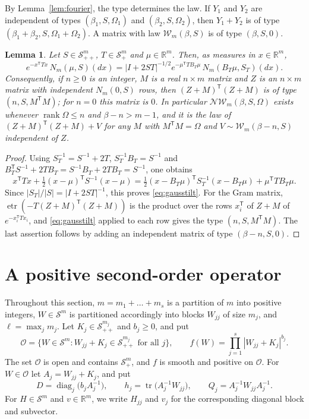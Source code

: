 \documentclass{amsart}
\newtheorem{lemma}[theorem]{Lemma}
\theoremstyle{definition}
\theoremstyle{remark}
\numberwithin{equation}{section}
\newcommand{\R}{\mathbb{R}}
\newcommand{\Sym}{\mathcal{S}}
\newcommand{\W}{\mathcal{W}}
\newcommand{\NW}{\mathcal{N}\!\mathcal{W}}
\newcommand{\tr}{\operatorname{tr}}
\newcommand{\etr}{\operatorname{etr}}
\newcommand{\rank}{\operatorname{rank}}
\newcommand{\diag}{\operatorname{diag}}
\begin{document}
By Lemma~\ref{lem:fourier}, the type determines the law. If $Y_1$ and $Y_2$ are independent of types $(\beta_1,S,\Omega_1)$ and $(\beta_2,S,\Omega_2)$, then $Y_1+Y_2$ is of type $(\beta_1+\beta_2,S,\Omega_1+\Omega_2)$. A matrix with law $\W_m(\beta,S)$ is of type $(\beta,S,0)$.

\begin{lemma}\label{lem:gauss}
Let $S\in\Sym^m_{++}$, $T\in\Sym^m_+$ and $\mu\in\R^m$. Then, as measures in $x\in\R^m$,
\begin{equation}\label{eq:gausstilt}
e^{-x^{\mathsf T}Tx}\,N_m(\mu,S)(dx)=|I+2ST|^{-1/2}e^{-\mu^{\mathsf T}TB_T\mu}\,N_m(B_T\mu,S_T)(dx).
\end{equation}
Consequently, if $n\ge0$ is an integer, $M$ is a real $n\times m$ matrix and $Z$ is an $n\times m$ matrix with independent $N_m(0,S)$ rows, then $(Z+M)^{\mathsf T}(Z+M)$ is of type $(n,S,M^{\mathsf T}M)$; for $n=0$ this matrix is $0$. In particular $\NW_m(\beta,S,\Omega)$ exists whenever $\rank\Omega\le n$ and $\beta-n>m-1$, and it is the law of $(Z+M)^{\mathsf T}(Z+M)+V$ for any $M$ with $M^{\mathsf T}M=\Omega$ and $V\sim\W_m(\beta-n,S)$ independent of $Z$.
\end{lemma}

\begin{proof}
Using $S_T^{-1}=S^{-1}+2T$, $S_T^{-1}B_T=S^{-1}$ and $B_T^{\mathsf T}S^{-1}+2TB_T=S^{-1}B_T+2TB_T=S^{-1}$, one obtains
\[
x^{\mathsf T}Tx+\tfrac12(x-\mu)^{\mathsf T}S^{-1}(x-\mu)=\tfrac12(x-B_T\mu)^{\mathsf T}S_T^{-1}(x-B_T\mu)+\mu^{\mathsf T}TB_T\mu .
\]
Since $|S_T|/|S|=|I+2ST|^{-1}$, this proves \eqref{eq:gausstilt}. For the Gram matrix, $\etr(-T(Z+M)^{\mathsf T}(Z+M))$ is the product over the rows $x_i^{\mathsf T}$ of $Z+M$ of $e^{-x_i^{\mathsf T}Tx_i}$, and \eqref{eq:gausstilt} applied to each row gives the type $(n,S,M^{\mathsf T}M)$. The last assertion follows by adding an independent matrix of type $(\beta-n,S,0)$.
\end{proof}

\section{A positive second-order operator}\label{sec:operator}

Throughout this section, $m=m_1+\dots+m_s$ is a partition of $m$ into positive integers, $W\in\Sym^m$ is partitioned accordingly into blocks $W_{jj}$ of size $m_j$, and $\ell=\max_jm_j$. Let $K_j\in\Sym^{m_j}_{++}$ and $b_j\ge0$, and put
\[
\mathcal O=\{W\in\Sym^m:W_{jj}+K_j\in\Sym^{m_j}_{++}\text{ for all }j\},\qquad
f(W)=\prod_{j=1}^s|W_{jj}+K_j|^{b_j}.
\]
The set $\mathcal O$ is open and contains $\Sym^m_+$, and $f$ is smooth and positive on $\mathcal O$. For $W\in\mathcal O$ let $A_j=W_{jj}+K_j$, and put
\[
D=\diag_j\bigl(b_jA_j^{-1}\bigr),\qquad h_j=\tr\bigl(A_j^{-1}W_{jj}\bigr),\qquad Q_j=A_j^{-1}W_{jj}A_j^{-1}.
\]
For $H\in\Sym^m$ and $v\in\R^m$, we write $H_{jj}$ and $v_j$ for the corresponding diagonal block and subvector.
\end{document}
